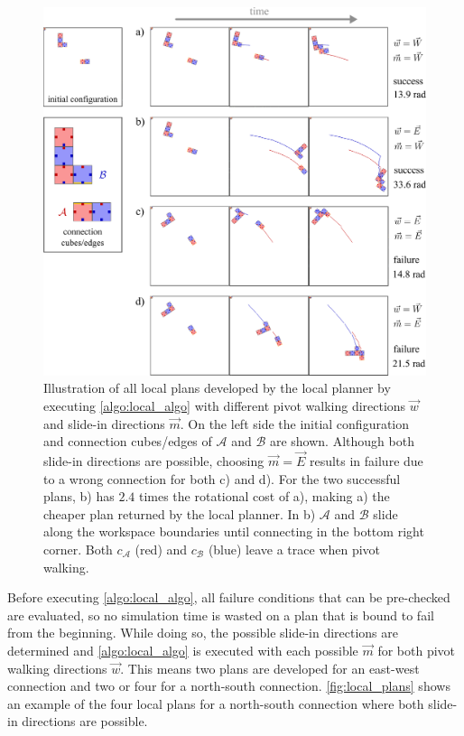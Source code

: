 \begin{figure}
	\centering
	\includegraphics[width=1\textwidth]{figures/local_plans.pdf}
	\caption[Local plans for all pivot walking and slide-in directions]{Illustration of all local plans developed by the local planner by executing \autoref{algo:local_algo} with different pivot walking directions $\vec{w}$ and slide-in directions $\vec{m}$. On the left side the initial configuration and connection cubes/edges of $\mathcal{A}$ and $\mathcal{B}$ are shown. Although both slide-in directions are possible, choosing $\vec{m}=\vec{E}$ results in failure due to a wrong connection for both c) and d). For the two successful plans, b) has $2.4$ times the rotational cost of a), making a) the cheaper plan returned by the local planner. In b) $\mathcal{A}$ and $\mathcal{B}$ slide along the workspace boundaries until connecting in the bottom right corner. Both $c_\mathcal{A}$ (red) and $c_\mathcal{B}$ (blue) leave a trace when pivot walking.}
	\label{fig:local_plans}
\end{figure}

Before executing \autoref{algo:local_algo}, all failure conditions that can be pre-checked are evaluated, so no simulation time is wasted on a plan that is bound to fail from the beginning.
While doing so, the possible slide-in directions are determined and \autoref{algo:local_algo} is executed with each possible $\vec{m}$ for both pivot walking directions $\vec{w}$.
This means two plans are developed for an east-west connection and two or four for a north-south connection.
\autoref{fig:local_plans} shows an example of the four local plans for a north-south connection where both slide-in directions are possible.

